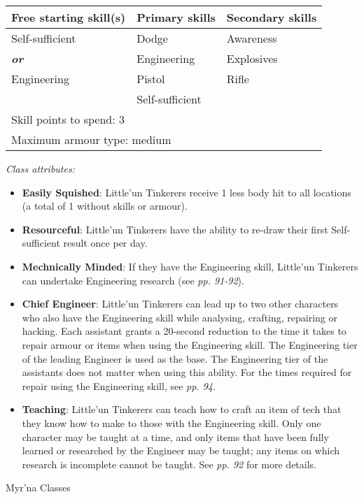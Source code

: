 \documentclass{scrbook}
\begin{document}
\begin{table}
\begin{tabular}{|l|l|l|} \hline 
Free starting skill(s) & Primary skills & Secondary skills \\
 \hline Self-sufficient & Dodge & Awareness \\
 \hline \textbf{\textit{or}} & Engineering & Explosives \\
 \hline Engineering & Pistol & Rifle \\
 \hline  & Self-sufficient &  \\
 \hline \multicolumn{3}{|l|}{Skill points to spend: 3} \\
 \hline \multicolumn{3}{|l|}{Maximum armour type: medium} \\
 \hline \end{tabular}

\end{table}

\textit{Class attributes:}

\begin{itemize}
\item \textbf{Easily Squished}: Little'un Tinkerers receive 1 less body hit to all locations (a total of 1 without skills or armour).

\item \textbf{Resourceful}: Little'un Tinkerers have the ability to re-draw their first Self-sufficient result once per day.

\item \textbf{Mechnically Minded}: If they have the Engineering skill, Little'un Tinkerers can undertake Engineering research (see \textit{pp. 91-92}).

\item \textbf{Chief Engineer}: Little'un Tinkerers can lead up to two other characters who also have the Engineering skill while analysing, crafting, repairing or hacking. Each assistant grants a 20-second reduction to the time it takes to repair armour or items when using the Engineering skill. The Engineering tier of the leading Engineer is used as the base. The Engineering tier of the assistants does not matter when using this ability. For the times required for repair using the Engineering skill, see \textit{pp. 94}.

\item \textbf{Teaching}: Little'un Tinkerers can teach how to craft an item of tech that they know how to make to those with the Engineering skill. Only one character may be taught at a time, and only items that have been fully learned or researched by the Engineer may be taught; any items on which research is incomplete cannot be taught. See \textit{pp. 92} for more details.

\end{itemize}
Myr'na Classes
\end{document}
